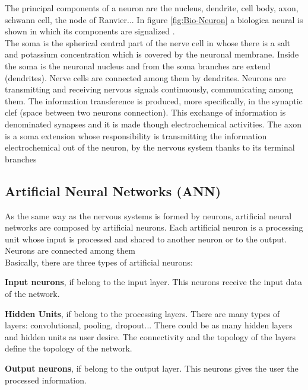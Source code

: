The principal components of a neuron are the nucleus, dendrite, cell body, axon, schwann cell, the node of Ranvier... In figure \ref{fig:Bio-Neuron} a biologica neural is shown in which its components are signalized \cite{BINN}.\\

The soma is the spherical central part of the nerve cell in whose there is a salt and potassium concentration which is covered by the neuronal membrane. Inside the soma is the neuronal nucleus and from the soma branches are extend (dendrites). Nerve cells are connected among them by dendrites. Neurons are transmitting and receiving nervous signals continuously, communicating among them. The information transference is produced, more specifically, in the synaptic clef (space between two neurons connection). This exchange of information is denominated synapses and it is made though electrochemical activities. The axon is a soma extension whose responsibility is transmitting the information electrochemical out of the neuron, by the nervous system thanks to its terminal branches \cite{BINN, neuroscience}\\

\subsection{Artificial Neural Networks (ANN)}
As the same way as the nervous systems is formed by neurons, artificial neural networks are composed by artificial neurons. Each artificial neuron is a processing unit whose input is processed and shared to another neuron or to the output. Neurons are connected among them \cite{BINN}\\

Basically, there are three types of artificial neurons:
\begin{description}[noitemsep,topsep=8pt,parsep=0pt,partopsep=20pt]
\item \textbf{Input neurons}, if belong to the input layer. This neurons receive the input data of the network.
\item \textbf{Hidden Units}, if belong to the processing layers. There are many types of layers: convolutional, pooling, dropout... There could be as many hidden layers and hidden units as user desire. The connectivity and the topology of the layers define the topology of the network.
\item \textbf{Output neurons}, if belong to the output layer. This neurons gives the user the processed information.
\end{description}

